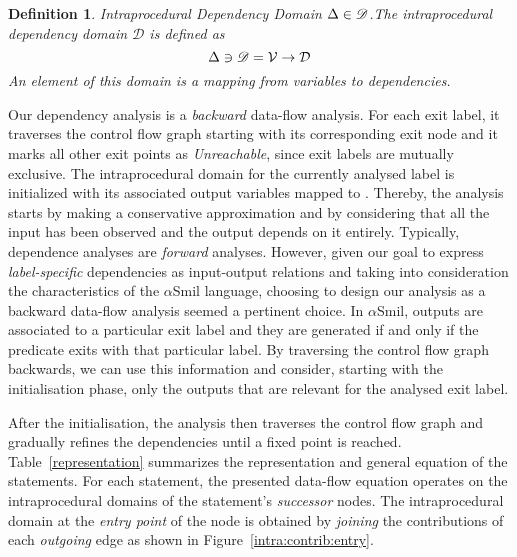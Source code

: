 \documentclass[11pt]{article}
\newtheorem{definition}{Definition}
\def\asmil{\textsf{$\alpha$Smil}}
\def\uintra{\mathscr{D}}
\begin{document}
\begin{definition}{Intraprocedural Dependency Domain $\intra \in \uintra$.}\label{ch5:intradom:definition}
The \emph{intraprocedural} dependency domain $\uintra$ is defined as 
%
\[\intra \ni \uintra =  \mathcal{V} \rightarrow \udep\]
% 
An element of this domain is a mapping from variables to dependencies.
\end{definition}


Our dependency analysis is a \emph{backward} data-flow analysis. For each exit 
label, it traverses the control flow graph starting with its corresponding exit 
node and it marks all other exit points as \emph{Unreachable}, since exit labels
are mutually exclusive. The intraprocedural domain for the currently analysed 
label is initialized with its associated output variables mapped to \everything. 
Thereby, the analysis starts by making a conservative approximation and by
considering that all the input has been observed and the output depends on it 
entirely. Typically, dependence analyses are \emph{forward} analyses. However, 
given our goal to express \emph{label-specific} dependencies as input-output 
relations and taking into consideration the characteristics of the {\asmil} 
language, choosing to design our analysis as a backward data-flow analysis 
seemed a pertinent choice. In {\asmil}, outputs are associated to a particular 
exit label and they are generated if and only if the predicate exits with that 
particular label. By traversing the control flow graph backwards, we can use
this information and consider, starting with the initialisation phase, only the outputs
that are relevant for the analysed exit label.  

After the initialisation, the analysis then traverses the control flow graph and
gradually refines the dependencies until a fixed point is reached.
Table~\ref{representation} summarizes the representation and general equation of
the statements. For each statement, the presented data-flow equation operates on
the intraprocedural domains of the statement's \emph{successor} nodes. The
intraprocedural domain at the \emph{entry point} of the node is obtained by
\emph{joining} the contributions of each \emph{outgoing} edge as shown in
Figure~\ref{intra:contrib:entry}.
\end{document}
